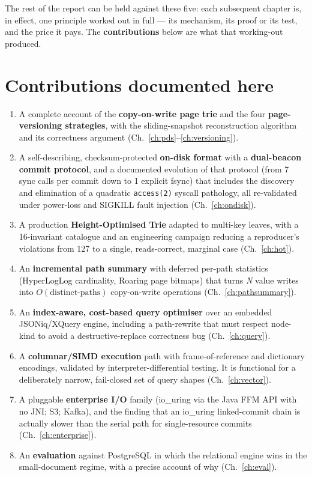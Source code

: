 \documentclass[11pt,a4paper,oneside]{report}
\theoremstyle{sirixthm}
\newcommand{\code}[1]{\texttt{#1}}
\begin{document}
\noindent The rest of the report can be held against these five: each subsequent chapter is, in effect,
one principle worked out in full --- its mechanism, its proof or its test, and the price it pays. The
\textbf{contributions} below are what that working-out produced.

\section{Contributions documented here}

\begin{enumerate}[label=\arabic*.,leftmargin=2em]
\item A complete account of the \textbf{copy-on-write page trie} and the four
  \textbf{page-versioning strategies}, with the sliding-snapshot reconstruction
  algorithm and its correctness argument (Ch.~\ref{ch:pds}--\ref{ch:versioning}).
\item A self-describing, checksum-protected \textbf{on-disk format} with a
  \textbf{dual-beacon commit protocol}, and a documented evolution of that protocol
  (from 7 sync calls per commit down to 1 explicit fsync) that includes the discovery and
  elimination of a quadratic \code{access(2)} syscall pathology, all re-validated under
  power-loss and SIGKILL fault injection (Ch.~\ref{ch:ondisk}).
\item A production \textbf{Height-Optimised Trie} adapted to multi-key leaves, with a
  16-invariant catalogue and an engineering campaign reducing a reproducer's violations
  from 127 to a single, reads-correct, marginal case (Ch.~\ref{ch:hot}).
\item An \textbf{incremental path summary} with deferred per-path statistics
  (HyperLogLog cardinality, Roaring page bitmaps) that turns \emph{N} value writes into
  $O(\text{distinct-paths})$ copy-on-write operations (Ch.~\ref{ch:pathsummary}).
\item An \textbf{index-aware, cost-based query optimiser} over an embedded
  JSONiq/XQuery engine, including a path-rewrite that must respect node-kind to avoid a
  destructive-replace correctness bug (Ch.~\ref{ch:query}).
\item A \textbf{columnar/SIMD execution} path with frame-of-reference and dictionary
  encodings, validated by interpreter-differential testing. It is functional for a
  deliberately narrow, fail-closed set of query shapes (Ch.~\ref{ch:vector}).
\item A pluggable \textbf{enterprise I/O} family (io\_uring via the Java FFM API with no
  JNI; S3; Kafka), and the finding that an io\_uring linked-commit chain is actually
  slower than the serial path for single-resource commits (Ch.~\ref{ch:enterprise}).
\item An \textbf{evaluation} against PostgreSQL in which the relational engine wins in
  the small-document regime, with a precise account of why (Ch.~\ref{ch:eval}).
\end{enumerate}
\end{document}
